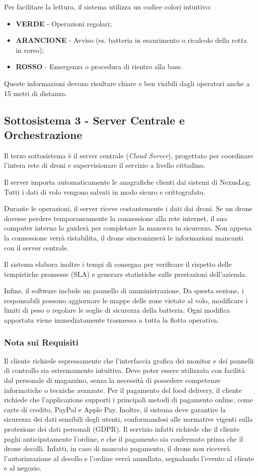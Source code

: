 \documentclass[11pt, a4paper]{article}
\begin{document}
Per facilitare la lettura, il sistema utilizza un codice colori intuitivo:
\begin{itemize}
    \item \textbf{VERDE} - Operazioni regolari;
    \item \textbf{ARANCIONE} - Avviso (es. batteria in esaurimento o ricalcolo della rotta in corso);
    \item \textbf{ROSSO} - Emergenza o procedura di rientro alla base.
\end{itemize}
Queste informazioni devono risultare chiare e ben visibili dagli operatori anche a 15 metri di distanza.

\subsection{Sottosistema 3 - Server Centrale e Orchestrazione}
Il terzo sottosistema è il server centrale (\textit{Cloud Server}), progettato per coordinare l'intera rete di droni e supervisionare il servizio a livello cittadino.

Il server importa automaticamente le anagrafiche clienti dai sistemi di NexusLog. Tutti i dati di volo vengono salvati in modo sicuro e crittografato.

Durante le operazioni, il server riceve costantemente i dati dai droni. Se un drone dovesse perdere temporaneamente la connessione alla rete internet, il suo computer interno lo guiderà per completare la manovra in sicurezza. Non appena la connessione verrà ristabilita, il drone sincronizzerà le informazioni mancanti con il server centrale.

Il sistema elabora inoltre i tempi di consegna per verificare il rispetto delle tempistiche promesse (SLA) e generare statistiche sulle prestazioni dell'azienda.

Infine, il software include un pannello di amministrazione. Da questa sezione, i responsabili possono aggiornare le mappe delle zone vietate al volo, modificare i limiti di peso o regolare le soglie di sicurezza della batteria. Ogni modifica apportata viene immediatamente trasmessa a tutta la flotta operativa.

\subsubsection*{Nota sui Requisiti}
Il cliente richiede espressamente che l'interfaccia grafica dei monitor e dei pannelli di controllo sia estremamente intuitiva. Deve poter essere utilizzata con facilità dal personale di magazzino, senza la necessità di possedere competenze informatiche o tecniche avanzate.
Per il pagamento del food delivery, il cliente richiede che l'applicazione supporti i principali metodi di pagamento online, come carte di credito, PayPal e Apple Pay. Inoltre, il sistema deve garantire la sicurezza dei dati sensibili degli utenti, conformandosi alle normative vigenti sulla protezione dei dati personali (GDPR). Il servizio infatti richiede che il cliente paghi anticipatamente l'ordine, e che il pagamento sia confermato prima che il drone decolli. Infatti, in caso di mancato pagamento, il drone non riceverà l'autorizzazione al decollo e l'ordine verrà annullato, segnalando l'evento al cliente e al negozio.
\end{document}
